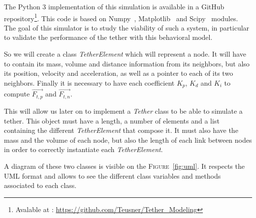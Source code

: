 The Python 3 implementation of this simulation is available in a GitHub repository\footnote{Avalable at : \url{https://github.com/Teusner/Tether\_Modeling}}. This code is based on Numpy~\cite{noauthor_numpy_nodate}, Matplotlib~\cite{noauthor_matplotlib_nodate} and Scipy~\cite{noauthor_scipyorg_nodate} modules. The goal of this simulator is to study the viability of such a system, in particular to validate the performance of the tether with this behavioral model.

So we will create a class \textit{TetherElement} which will represent a node. It will have to contain its mass, volume and distance information from its neighbors, but also its position, velocity and acceleration, as well as a pointer to each of its two neighbors. Finally it is necessary to have each coefficient $K_p$, $K_d$ and $K_i$ to compute $\overrightarrow{F_{t, p}}$ and $\overrightarrow{F_{t, n}}$.

This will allow us later on to implement a \textit{Tether} class to be able to simulate a tether. This object must have a length, a number of elements and a list containing the different \textit{TetherElement} that compose it. It must also have the mass and the volume of each node, but also the length of each link between nodes in order to correctly instantiate each \textit{TetherElement}.

A diagram of these two classes is visible on the \textsc{Figure}~\ref{fig:uml}. It respects the \textsc{UML} format and allows to see the different class variables and methods associated to each class.

